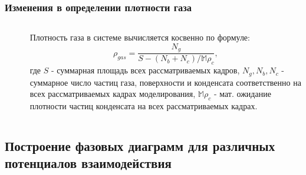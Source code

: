 \documentclass[pdf,hyperref={unicode}]{beamer}
\begin{document}
\begin{frame}
\transdissolve[duration=0.2]
\frametitle{Изменения в определении плотности газа}
\begin{columns}


\begin{column}{0.55\linewidth}
{
\begin{figure}[h]
\end{figure}
}
\end{column}

\begin{column}{0.4\linewidth}
{
\tiny{
Плотность газа в системе вычисляется косвенно по формуле:
\begin{equation}
\rho_{gas} = \frac{N_{g}}{S - (N_{b} + N_{c}) / \mathbb{M}\rho_c},
\label{eqGas}
\end{equation}
где $S$ - суммарная площадь всех рассматриваемых кадров, $N_g, N_b, N_c$ - суммарное число частиц газа, поверхности и конденсата соответственно на всех рассматриваемых кадрах моделирования, $\mathbb{M}\rho_c$ - мат. ожидание плотности частиц конденсата на всех рассматриваемых кадрах.
}
}
\end{column}

\end{columns}
\end{frame}



\subsection{Построение фазовых диаграмм для различных потенциалов взаимодействия}
\end{document}
